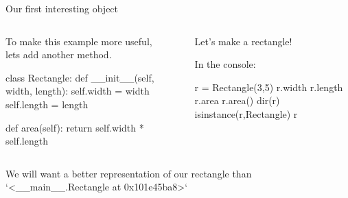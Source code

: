 \documentclass[aspectratio=149] {beamer}
\begin{document}
\begin{frame}[fragile,t]{Our first interesting object}


  \begin{columns}
    \begin{column}[t]{.59\textwidth}
      To make this example more useful,\\lets add another method. 
 
      \pause
      \begin{smallpythoncode}
        class Rectangle:
            def __init__(self, width, length):
                self.width = width
                self.length = length
    
            def area(self):
                return self.width * self.length
      \end{smallpythoncode}
    \end{column}
    \begin{column}[t]{.42\textwidth}
      Let's make a rectangle!  

      In the console:
      \begin{pythoncode}
        r = Rectangle(3,5)
        r.width
        r.length
        r.area
        r.area()
        dir(r)
        isinstance(r,Rectangle)
        r
      \end{pythoncode}
    \end{column}
  \end{columns}

  \bigskip \pause
  
  We will want a better representation of our rectangle than \inline`<__main__.Rectangle at 0x101e45ba8>`

\end{frame}
\end{document}
